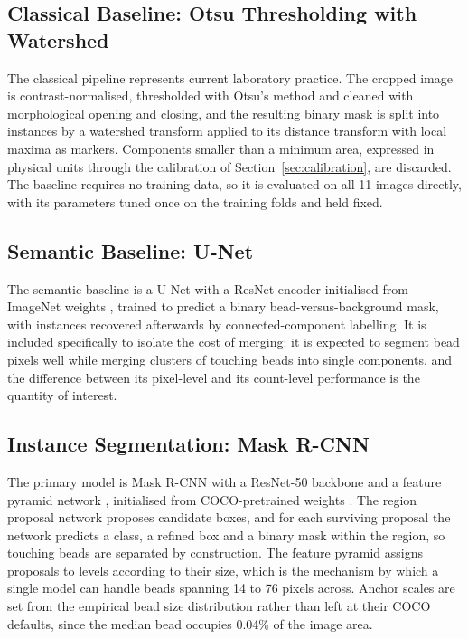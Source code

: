 \subsection{Classical Baseline: Otsu Thresholding with Watershed}

The classical pipeline represents current laboratory practice. The cropped
image is contrast-normalised, thresholded with Otsu's method
\cite{otsu1979threshold} and cleaned with morphological opening and closing, and
the resulting binary mask is split into instances by a watershed transform
\cite{vincent1991watersheds} applied to its distance transform with local maxima
as markers. Components smaller than a minimum area, expressed in physical units
through the calibration of Section~\ref{sec:calibration}, are discarded. The
baseline requires no training data, so it is evaluated on all 11 images
directly, with its parameters tuned once on the training folds and held fixed.

\subsection{Semantic Baseline: U-Net}

The semantic baseline is a U-Net \cite{ronneberger2015unet} with a ResNet encoder
\cite{he2016deep} initialised from ImageNet weights \cite{deng2009imagenet},
trained to predict a binary bead-versus-background mask, with instances recovered
afterwards by connected-component labelling. It is included specifically to
isolate the cost of merging: it is expected to segment bead pixels well while
merging clusters of touching beads into single components, and the difference between its
pixel-level and its count-level performance is the quantity of interest.

\subsection{Instance Segmentation: Mask R-CNN}

The primary model is Mask R-CNN \cite{he2017mask} with a ResNet-50 backbone
\cite{he2016deep} and a feature pyramid network \cite{lin2017feature}, initialised
from COCO-pretrained weights \cite{lin2014microsoft}. The region proposal network
proposes candidate boxes, and for each surviving proposal the network predicts a
class, a refined box and a binary mask within the region, so touching beads are
separated by construction. The feature pyramid assigns proposals to levels
according to their size, which is the mechanism by which a single model can handle
beads spanning 14 to 76 pixels across. Anchor scales are set from the empirical
bead size distribution rather than left at their COCO defaults, since the median
bead occupies 0.04\% of the image area.

